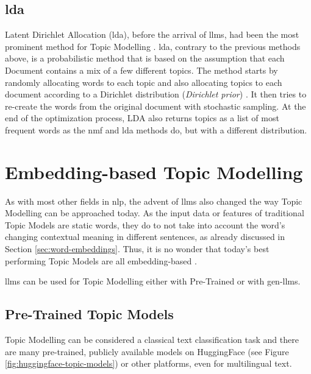 \subsection{\gls{lda}}\label{subsec:lda}
Latent Dirichlet Allocation (\gls{lda}), before the arrival of \glspl{llm}, had been the most prominent method for Topic Modelling \cite{blueprints}.
\gls{lda}, contrary to the previous methods above, is a probabilistic method that is based on the assumption that each Document contains a mix of a few different topics.
The method starts by randomly allocating words to each topic and also allocating topics to each document according to a Dirichlet distribution (\emph{Dirichlet prior}) \cite{blueprints}.
It then tries to re-create the words from the original document with stochastic sampling.
At the end of the optimization process, LDA also returns topics as a list of most frequent words as the \gls{nmf} and \gls{lda} methods do, but with a different distribution.

\section{Embedding-based Topic Modelling}\label{sec:topic_embedding_approaches}
As with most other fields in \gls{nlp}, the advent of \glspl{llm} also changed the way Topic Modelling can be approached today.
As the input data or features of traditional Topic Models are static words, they do to not take into account
the word's changing contextual meaning in different sentences, as already discussed in Section \ref{sec:word-embeddings}.
Thus, it is no wonder that today's best performing Topic Models are all embedding-based \cite{leaderboard-topic-models}.


\glspl{llm} can be used for Topic Modelling either with Pre-Trained or with \gls{gen-llm}s.

\subsection{Pre-Trained Topic Models}
Topic Modelling can be considered a classical text classification task and there are many pre-trained, publicly available models on HuggingFace \cite{huggingface} (see Figure \ref{fig:huggingface-topic-models}) or other platforms, even for multilingual text.

